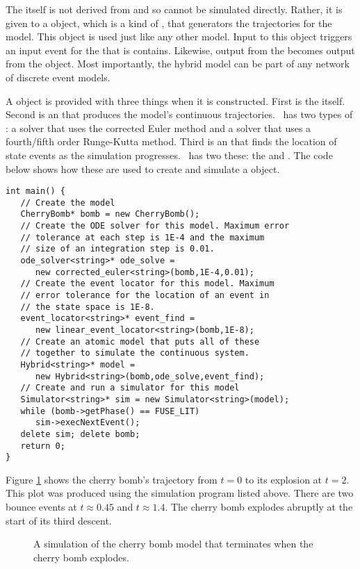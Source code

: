 The  itself is not derived from  and so cannot be simulated directly. Rather, it is given to a  object, which is a kind of , that generators the trajectories for the model. This  object is used just like any other  model. Input to this  object triggers an input event for the  that is contains. Likewise, output from the  becomes output from the  object. Most importantly, the hybrid model can be part of any network of discrete event models.

A  object is provided with three things when it is constructed. First is the  itself. Second is an  that produces the model's continuous trajectories. \adevs\ has two types of : a  solver that uses the corrected Euler method and a  solver that uses a fourth/fifth order Runge-Kutta method. Third is an  that finds the location of state events as the simulation progresses. \adevs\ has two these: the  and . The code below shows how these are used to create and simulate a  object.
\begin{verbatim}
int main() {
   // Create the model
   CherryBomb* bomb = new CherryBomb();
   // Create the ODE solver for this model. Maximum error
   // tolerance at each step is 1E-4 and the maximum
   // size of an integration step is 0.01.
   ode_solver<string>* ode_solve =
      new corrected_euler<string>(bomb,1E-4,0.01);
   // Create the event locator for this model. Maximum
   // error tolerance for the location of an event in
   // the state space is 1E-8.
   event_locator<string>* event_find =
      new linear_event_locator<string>(bomb,1E-8);
   // Create an atomic model that puts all of these
   // together to simulate the continuous system.
   Hybrid<string>* model =
      new Hybrid<string>(bomb,ode_solve,event_find);
   // Create and run a simulator for this model
   Simulator<string>* sim = new Simulator<string>(model);
   while (bomb->getPhase() == FUSE_LIT)
      sim->execNextEvent();
   delete sim; delete bomb;
   return 0;
}
\end{verbatim}

Figure \ref{fig:cherry_bomb_trajectory} shows the cherry bomb's trajectory from $t=0$ to its explosion at $t=2$. This plot was produced using the simulation program listed above. There are two bounce events at $t \approx 0.45$ and $t \approx 1.4$. The cherry bomb explodes abruptly at the start of its third descent.
\begin{figure}[ht]
\centering
{}
\caption{A simulation of the cherry bomb model that terminates when the cherry bomb explodes.}
\label{fig:cherry_bomb_trajectory}
\end{figure}


